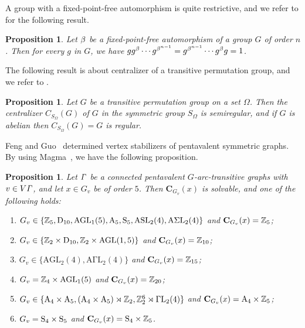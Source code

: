 \documentclass[12pt,reqno]{amsart}
\newcommand\A{\mathrm{A}} \newcommand\AGL{\mathrm{AGL}} \newcommand\AGammaL{\mathrm{A\Gamma L}} \newcommand\Alt{\mathrm{Alt}} \newcommand\ASL{\mathrm{ASL}} \newcommand\ASigmaL{\mathrm{A \Sigma L}} \newcommand\Aut{\mathrm{Aut}}
\def\C{\mathbf{C}}   \newcommand\Cay{\mathrm{Cay}}   \newcommand\Cos{\mathrm{Cos}} \newcommand{\CGammaSp}{\mathrm{C\Gamma Sp}}
\newcommand\D{\mathrm{D}}   \def\det{{\sf det}}
\newcommand\mz{\mathbb{Z}}
\numberwithin {equation} {section}
\newtheorem{proposition}[theorem]{Proposition}
\begin{document}
A group with a fixed-point-free automorphism is quite restrictive, and we refer to \cite[Chapter 10: Lemma~1.1]{DG} for the following result.

\begin{proposition} \label{fixed-point-free-atuo}
Let $\beta$ be a fixed-point-free automorphism of a group $G$ of order $n$. Then for every $g$ in $G$, we have $gg^{\beta}\cdots g^{\beta^{n-1}}= g^{\beta^{n-1}}\cdots g^{\beta}g=1$.
\end{proposition}


The following result is about centralizer of a transitive permutation group, and we refer to \cite[Theorem 4.2A]{DM-book}.

\begin{proposition} \label{regulargroup} Let $G$ be a transitive permutation group on a set $\Omega$. Then the centralizer $C_{S_\Omega}(G)$ of $G$ in the symmetric group $S_{\Omega}$ is semiregular, and if $G$ is abelian then $C_{S_\Omega}(G)=G$ is regular.
\end{proposition}


Feng and Guo~\cite{Feng-Guo} determined vertex stabilizers of pentavalent symmetric graphs. By using {\sc Magma}~\cite{Magma}, we have the following proposition.

\begin{proposition}\label{pro:val5stab}
Let ${\it \Gamma}$ be a connected pentavalent $G$-arc-transitive graphs with $v \in V{\it \Gamma}$, and let $x \in G_v$ be of order $5$. Then $ \C_{G_v}(x)$ is solvable, and one of the following holds:

\begin{enumerate}[\rm (1)]
\item  $G_v \in \{ \ZZ_5,\D_{10},\AGL_1(5),\A_5,\Sy_5,\ASL_2(4), \ASigmaL_2(4)\}$ and  $ \C_{G_v}(x)=\ZZ_5$;

\item    $G_v \in \{\ZZ_2 \times \D_{10},\ZZ_2 \times\AGL(1,5) \}$  and $ \C_{G_v}(x)=\ZZ_{10}$;

\item   $G_v \in \{ \AGL_2(4),\AGammaL_2(4) \}$ and $ \C_{G_v}(x)=\ZZ_{15}$;

\item  $G_v = \ZZ_4 \times \AGL_1(5) $ and $ \C_{G_v}(x)=\ZZ_{20}$;

\item   $G_v \in \{ \A_4 \times \A_5,(\A_4 \times \A_5)\rtimes\ZZ_2,
\mz_2^6\rtimes\GammaL_2(4)\}$  and $ \C_{G_v}(x)=\A_4 \times \ZZ_{5}$;

\item  $G_v =\mathrm{S}_4 \times\mathrm{S}_5 $ and $ \C_{G_v}(x)=\Sy_4 \times \ZZ_{5}$.

\end{enumerate}

\end{proposition}
\end{document}
